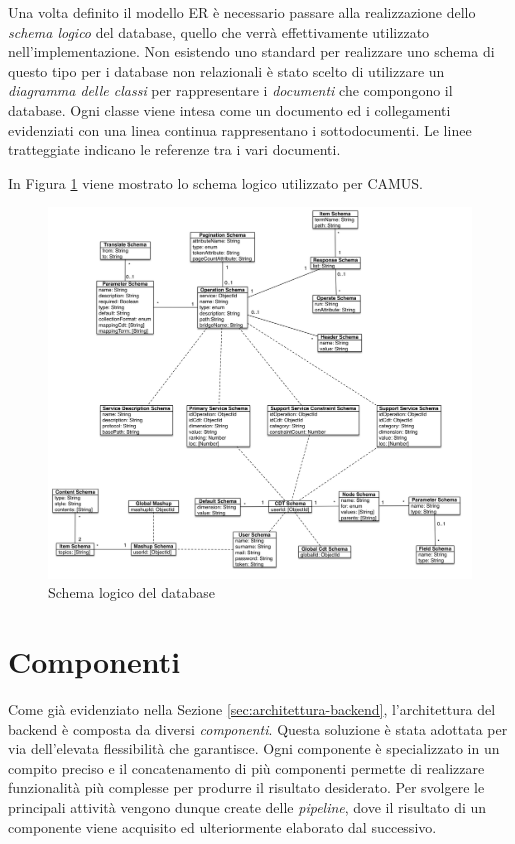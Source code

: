 Una volta definito il modello ER è necessario passare alla realizzazione dello \emph{schema logico} del database, quello che verrà effettivamente utilizzato nell'implementazione. Non esistendo uno standard per realizzare uno schema di questo tipo per i database non relazionali è stato scelto di utilizzare un \emph{diagramma delle classi} per rappresentare i \emph{documenti} che compongono il database. Ogni classe viene intesa come un documento ed i collegamenti evidenziati con una linea continua rappresentano i sottodocumenti. Le linee tratteggiate indicano le referenze tra i vari documenti.

In Figura \ref{fig:schema-logico-db} viene mostrato lo schema logico utilizzato per CAMUS.

\begin{figure}[ht]
	\centering
	\includegraphics[width=\textwidth]{5-implementazione-backend/Immagini/schema_logico_db.png}
	\caption{Schema logico del database}\label{fig:schema-logico-db}
\end{figure}

\section{Componenti\label{sec:componenti-backend}}

Come già evidenziato nella Sezione \ref{sec:architettura-backend}, l'architettura del backend è composta da diversi \emph{componenti}. Questa soluzione è stata adottata per via dell'elevata flessibilità che garantisce. Ogni componente è specializzato in un compito preciso e il concatenamento di più componenti permette di realizzare funzionalità più complesse per produrre il risultato desiderato. Per svolgere le principali attività vengono dunque create delle \emph{pipeline}, dove il risultato di un componente viene acquisito ed ulteriormente elaborato dal successivo.

